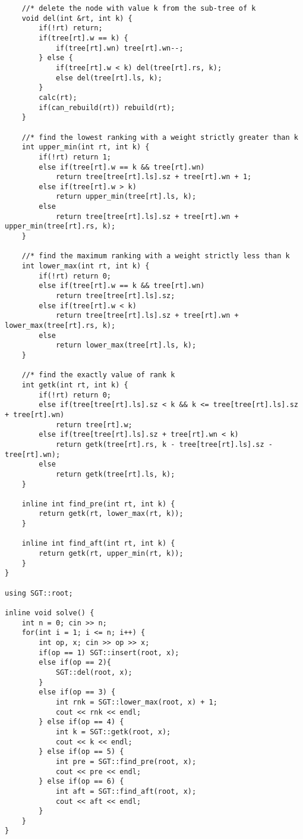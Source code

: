 \documentclass[]{article}
\begin{document}
\begin{verbatim}
    //* delete the node with value k from the sub-tree of k
    void del(int &rt, int k) {
        if(!rt) return;
        if(tree[rt].w == k) {
            if(tree[rt].wn) tree[rt].wn--;
        } else {
            if(tree[rt].w < k) del(tree[rt].rs, k);
            else del(tree[rt].ls, k);
        }
        calc(rt);
        if(can_rebuild(rt)) rebuild(rt);
    }
    
    //* find the lowest ranking with a weight strictly greater than k
    int upper_min(int rt, int k) {
        if(!rt) return 1;
        else if(tree[rt].w == k && tree[rt].wn)
            return tree[tree[rt].ls].sz + tree[rt].wn + 1;
        else if(tree[rt].w > k)
            return upper_min(tree[rt].ls, k);
        else
            return tree[tree[rt].ls].sz + tree[rt].wn + upper_min(tree[rt].rs, k);
    }

    //* find the maximum ranking with a weight strictly less than k
    int lower_max(int rt, int k) {
        if(!rt) return 0;
        else if(tree[rt].w == k && tree[rt].wn)
            return tree[tree[rt].ls].sz;
        else if(tree[rt].w < k)
            return tree[tree[rt].ls].sz + tree[rt].wn + lower_max(tree[rt].rs, k);
        else
            return lower_max(tree[rt].ls, k);
    }
    
    //* find the exactly value of rank k
    int getk(int rt, int k) {
        if(!rt) return 0;
        else if(tree[tree[rt].ls].sz < k && k <= tree[tree[rt].ls].sz + tree[rt].wn)
            return tree[rt].w;
        else if(tree[tree[rt].ls].sz + tree[rt].wn < k)
            return getk(tree[rt].rs, k - tree[tree[rt].ls].sz - tree[rt].wn);
        else
            return getk(tree[rt].ls, k);
    }

    inline int find_pre(int rt, int k) {
        return getk(rt, lower_max(rt, k));
    }

    inline int find_aft(int rt, int k) {
        return getk(rt, upper_min(rt, k));
    }
}

using SGT::root;

inline void solve() {
    int n = 0; cin >> n;
    for(int i = 1; i <= n; i++) {
        int op, x; cin >> op >> x;
        if(op == 1) SGT::insert(root, x);
        else if(op == 2){
            SGT::del(root, x);
        }
        else if(op == 3) {
            int rnk = SGT::lower_max(root, x) + 1;
            cout << rnk << endl;
        } else if(op == 4) {
            int k = SGT::getk(root, x);
            cout << k << endl;
        } else if(op == 5) {
            int pre = SGT::find_pre(root, x);
            cout << pre << endl;
        } else if(op == 6) {
            int aft = SGT::find_aft(root, x);
            cout << aft << endl;
        }
    }
}
\end{verbatim}
\end{document}
